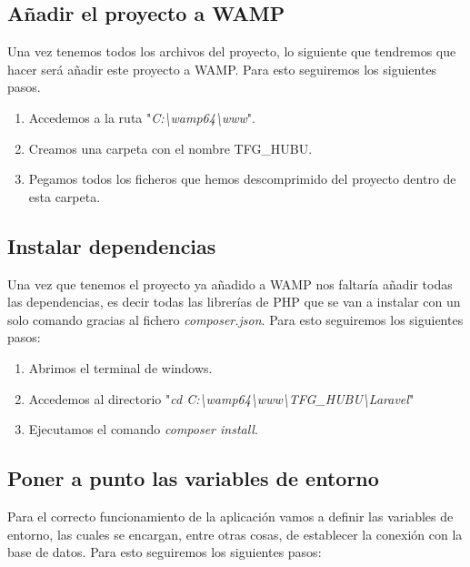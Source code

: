 \subsection{Añadir el proyecto a WAMP}

Una vez tenemos todos los archivos del proyecto, lo siguiente que tendremos que hacer será añadir este proyecto a WAMP. Para esto seguiremos los siguientes pasos.

\begin{enumerate}
    \item Accedemos a la ruta "\textit{C:\textbackslash{}wamp64\textbackslash{}www}"{}.
    \item Creamos una carpeta con el nombre TFG\_HUBU.
    \item Pegamos todos los ficheros que hemos descomprimido del proyecto dentro de esta carpeta.
\end{enumerate}

\subsection{Instalar dependencias}

Una vez que tenemos el proyecto ya añadido a WAMP nos faltaría añadir todas las dependencias, es decir todas las librerías de PHP que se van a instalar con un solo comando gracias al fichero \textit{composer.json}. Para esto seguiremos los siguientes pasos:

\begin{enumerate}
    \item Abrimos el terminal de windows.
    \item Accedemos al directorio "\textit{cd C:\textbackslash{}wamp64\textbackslash{}www\textbackslash{}TFG\_HUBU\textbackslash{}Laravel}"
    \item Ejecutamos el comando \textit{composer install}.
\end{enumerate}

\subsection{Poner a punto las variables de entorno}

Para el correcto funcionamiento de la aplicación vamos a definir las variables de entorno, las cuales se encargan, entre otras cosas, de establecer la conexión con la base de datos. Para esto seguiremos los siguientes pasos:

